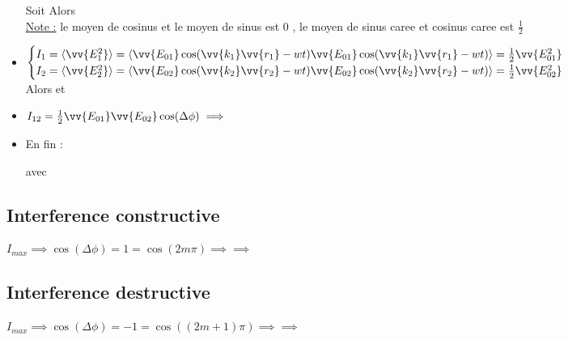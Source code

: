 \documentclass[12pt]{book}
\begin{document}
\begin{itemize}
                    Soit  Alors \\ 
                    \underline{Note :} le moyen de cosinus et le moyen de sinus est $0$ , le moyen de sinus caree et cosinus caree est $\frac{1}{2}$
                \item $\begin{cases}
                    I_1 = \langle \vv{E_1^2 }\rangle = \langle \vv{E_{01}}\cos(\vv{k_1}\vv{r_1} -wt)\vv{E_{01}}\cos(\vv{k_1}\vv{r_1}-wt) \rangle =\frac{1}{2}\vv{E_{01}^2}\\
                    I_2  = \langle \vv{E_2^2 }\rangle = \langle \vv{E_{02}}\cos(\vv{k_2}\vv{r_2} -wt)\vv{E_{02}}\cos(\vv{k_2}\vv{r_2}-wt) \rangle =\frac{1}{2}\vv{E_{02}^2}
                    \end{cases}$\\
                    Alors  et 
                \item  $I_{12}=\frac{1}{2}\vv{E_{01}}\vv{E_{02}}\cos(\Delta\phi) \implies $
                \item  En fin : \begin{center}
                     avec 
                \end{center}
            \end{itemize}
            
            \subsection*{Interference constructive}
                $I_{max} \implies \cos(\Delta\phi) = 1 = \cos(2m\pi)\implies$$\implies$\\
            \subsection*{Interference destructive}
                $I_{max} \implies \cos(\Delta\phi) = -1 = \cos((2m+1)\pi)\implies$$\implies$\\
\end{document}
